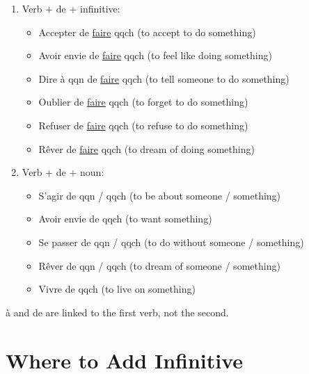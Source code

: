\documentclass{book}
\begin{document}
\begin{enumerate}
    \item Verb + de + infinitive:
    \begin{itemize}
        \item Accepter de \underline{faire} qqch (to accept to do something)
        \item Avoir envie de \underline{faire} qqch (to feel like doing something)
        \item Dire à qqn de \underline{faire} qqch (to tell someone to do something)
        \item Oublier de \underline{faire} qqch (to forget to do something)
        \item Refuser de \underline{faire} qqch (to refuse to do something)
        \item Rêver de \underline{faire} qqch (to dream of doing something)
    \end{itemize}

    \item Verb + de + noun:
    \begin{itemize}
        \item S'agir de qqn / qqch (to be about someone / something)
        \item Avoir envie de qqch (to want something)
        \item Se passer de qqn / qqch (to do without someone / something)
        \item Rêver de qqn / qqch (to dream of someone / something)
        \item Vivre de qqch (to live on something)
    \end{itemize}
\end{enumerate}
à and de are linked to the first verb, not the second.

\section{Where to Add Infinitive}
\end{document}
